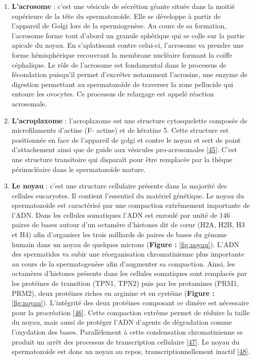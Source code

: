 \documentclass[12pt,a4paper,twoside]{ugathesis}
\theoremstyle{definition}
\theoremstyle{definition}
\theoremstyle{definition}
\theoremstyle{remark}
\begin{document}
\begin{enumerate}
\def\labelenumi{\arabic{enumi}.}
\item
  \textbf{L'acrosome} : c'est une vésicule de sécrétion géante située
  dans la moitié supérieure de la tête du spermatozoïde. Elle se
  développe à partir de l'appareil de Golgi lors de la spermiogenèse. Au
  cours de sa formation, l'acrosome forme tout d'abord un granule
  sphérique qui se colle sur la partie apicale du noyau. En
  s'aplatissant contre celui-ci, l'acrosome va prendre une forme
  hémisphérique recouvrant la membrane nucléaire formant la coiffe
  céphalique. Le rôle de l'acrosome est fondamental dans le processus de
  fécondation puisqu'il permet d'excréter notamment l'acrosine, une
  enzyme de digestion permettant au spermatozoïde de traverser la zone
  pellucide qui entoure les ovocytes. Ce processus de relargage est
  appelé réaction acrosomale.
\item
  \textbf{L'acroplaxome} : l'acroplaxome est une structure cytosquelette
  composée de microfilaments d'actine (F- actine) et de kératine 5.
  Cette structure est positionnée en face de l'appareil de golgi et
  contre le noyau et sert de point d'attachement ainsi que de guide aux
  vésicules pro-acrosomales
  {[}\protect\hyperlink{ref-Kierszenbaum2004}{45}{]}. C'est une
  structure transitoire qui disparaît pour être remplacée par la thèque
  périnucléaire dans le spermatozoïde mature.
\item
  \textbf{Le noyau} : c'est une structure cellulaire présente dans la
  majorité des cellules eucaryotes. Il contient l'essentiel du matériel
  génétique. Le noyau du spermatozoïde est caractérisé par une
  compaction extrêmement importante de l'ADN. Dans les cellules
  somatiques l'ADN est enroulé par unité de 146 paires de bases autour
  d'un octamère d'histones dit de cœur (H2A, H2B, H3 et H4) afin
  d'organiser les trois milliards de paires de bases du génome humain
  dans un noyau de quelques microns (\textbf{Figure : }\ref{fig:noyau}).
  L'ADN des spermatides va subir une réorganisation chromatinienne plus
  importante au cours de la spermatogenèse afin d'augmenter sa
  compaction. Ainsi, les octamères d'histones présents dans les cellules
  somatiques sont remplacés par les protéines de transition (TPN1, TPN2)
  puis par les protamines (PRM1, PRM2), deux protéines riches en
  arginine et en cystéine (\textbf{Figure : }\ref{fig:noyau}).
  L'intégrité des deux protéines composant ce dimère est nécessaire pour
  la procréation {[}\protect\hyperlink{ref-Cho2001}{46}{]}. Cette
  compaction extrême permet de réduire la taille du noyau, mais aussi de
  protéger l'ADN d'agents de dégradation comme l'oxydation des bases.
  Parallèlement à cette condensation chromatinienne se produit un arrêt
  des processus de transcription cellulaire
  {[}\protect\hyperlink{ref-Kierszenbaum1978}{47}{]}. Le noyau du
  spermatozoïde est donc un noyau au repos, transcriptionnellement
  inactif {[}\protect\hyperlink{ref-Ward1994}{48}{]}.
\end{enumerate}
\end{document}
